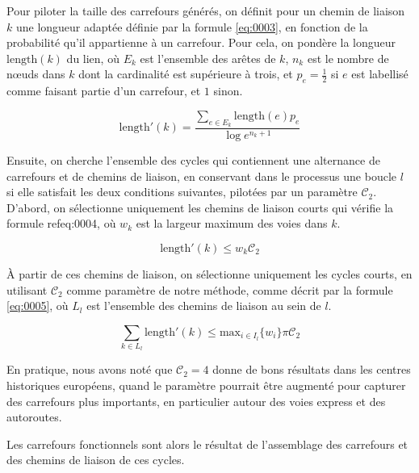 \newpar{}

Pour piloter la taille des carrefours générés, on définit pour un chemin de liaison $k$ une longueur adaptée définie par la formule \ref{eq:0003}, en fonction de la probabilité qu'il appartienne à un carrefour. Pour cela, on pondère la longueur $\mathrm{length}(k)$ du lien, où $E_k$ est l'ensemble des arêtes de $k$, $n_k$ est le nombre de nœuds dans $k$ dont la cardinalité est supérieure à trois, et $p_e=\frac{1}{2}$ si $e$ est labellisé comme faisant partie d'un carrefour, et $1$ sinon.

\begin{equation}
 \mathrm{length}'(k) = \frac{\sum_{e \in E_k}\mathrm{length}(e) p_e}{\log e^{n_k +1}}
 \label{eq:0003}
\end{equation}

Ensuite, on cherche l'ensemble des cycles qui contiennent une alternance de carrefours et de chemins de liaison, en conservant dans le processus une boucle $l$ si elle satisfait les deux conditions suivantes, pilotées par un paramètre $\mathcal{C}_2$.
D'abord, on sélectionne uniquement les chemins de liaison courts qui vérifie la formule ref{eq:0004}, où $w_k$ est la largeur maximum des voies dans $k$.

\begin{equation}
\mathrm{length}'(k) \leq w_k \mathcal{C}_2
\label{eq:0004}
\end{equation}

À partir de ces chemins de liaison, on sélectionne uniquement les cycles courts, en utilisant $\mathcal{C}_2$ comme paramètre de notre méthode, comme décrit par la formule \ref{eq:0005}, où $L_l$ est l'ensemble des chemins de liaison au sein de $l$.

\begin{equation}
\sum_{k \in L_l} \mathrm{length}'(k) \leq \mathrm{max}_{i \in I_l}\{w_i\} \pi \mathcal{C}_2
\label{eq:0005}
\end{equation}

En pratique, nous avons noté que $\mathcal{C}_2=4$ donne de bons résultats dans les centres historiques européens, quand le paramètre pourrait être augmenté pour capturer des carrefours plus importants, en particulier autour des voies express et des autoroutes.

\newpar{}

Les carrefours fonctionnels sont alors le résultat de l'assemblage des carrefours et des chemins de liaison de ces cycles.

\newpar{}


